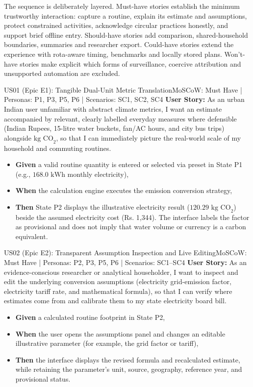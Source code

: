 \documentclass[12pt,a4paper]{article}
\begin{document}
The sequence is deliberately layered. Must-have stories establish the minimum trustworthy interaction: capture a routine, explain its estimate and assumptions, protect constrained activities, acknowledge circular practices honestly, and support brief offline entry. Should-have stories add comparison, shared-household boundaries, summaries and researcher export. Could-have stories extend the experience with rota-aware timing, benchmarks and locally stored plans. Won't-have stories make explicit which forms of surveillance, coercive attribution and unsupported automation are excluded.

\begin{storybox}{US01 (Epic E1): Tangible Dual-Unit Metric Translation}{MoSCoW: Must Have | Personas: P1, P3, P5, P6 | Scenarios: SC1, SC2, SC4}
\textbf{User Story:} As an urban Indian user unfamiliar with abstract climate metrics, I want an estimate accompanied by relevant, clearly labelled everyday measures where defensible (Indian Rupees, 15-litre water buckets, fan/AC hours, and city bus trips) alongside $\text{kg CO}_2$, so that I can immediately picture the real-world scale of my household and commuting routines.
\begin{itemize}
    \item \textbf{Given} a valid routine quantity is entered or selected via preset in State P1 (e.g., $168.0\text{ kWh}$ monthly electricity),
    \item \textbf{When} the calculation engine executes the emission conversion strategy,
    \item \textbf{Then} State P2 displays the illustrative electricity result ($120.29\text{ kg CO}_2$) beside the assumed electricity cost (Rs. 1,344). The interface labels the factor as provisional and does not imply that water volume or currency is a carbon equivalent.
\end{itemize}
\end{storybox}

\begin{storybox}{US02 (Epic E2): Transparent Assumption Inspection and Live Editing}{MoSCoW: Must Have | Personas: P2, P3, P5, P6 | Scenarios: SC1--SC4}
\textbf{User Story:} As an evidence-conscious researcher or analytical householder, I want to inspect and edit the underlying conversion assumptions (electricity grid-emission factor, electricity tariff rate, and mathematical formula), so that I can verify where estimates come from and calibrate them to my state electricity board bill.
\begin{itemize}
    \item \textbf{Given} a calculated routine footprint in State P2,
    \item \textbf{When} the user opens the assumptions panel and changes an editable illustrative parameter (for example, the grid factor or tariff),
    \item \textbf{Then} the interface displays the revised formula and recalculated estimate, while retaining the parameter's unit, source, geography, reference year, and provisional status.
\end{itemize}
\end{storybox}
\end{document}
